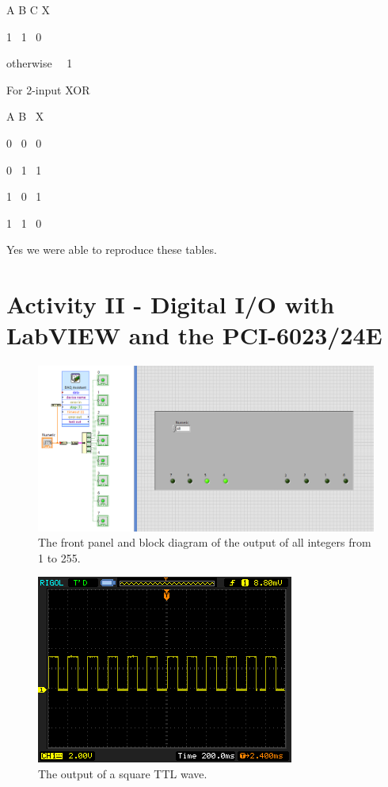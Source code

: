 \documentclass[11pt]{article}
\begin{document}
A \quad B  \quad  C  \quad X

1  \quad\,  1   \quad\,   0

otherwise \quad \ \, 1

\vbox{}

For 2-input XOR

A \quad B   \quad \ X

0  \quad\,  0 \quad\,   0

0  \quad\,  1 \quad\,   1

1  \quad\,  0 \quad\,   1

1  \quad\,  1 \quad\,   0

\vbox{}

Yes we were able to reproduce these tables.


\section{Activity II - Digital I/O with LabVIEW and the PCI-6023/24E}


\begin{figure}[H]
 \begin{center}
  \includegraphics[width=\linewidth/1]{act2_2}
  \caption{The front panel and block diagram of the output of all integers from 1 to 255.}
  \label{fig:act2_2}
 \end{center}
\end{figure}

\begin{figure}[H]
 \begin{center}
  \includegraphics[width=\linewidth/2]{act2_2b}
  \caption{The output of a square TTL wave.}
  \label{fig:act2_2b}
 \end{center}
\end{figure}
\end{document}
